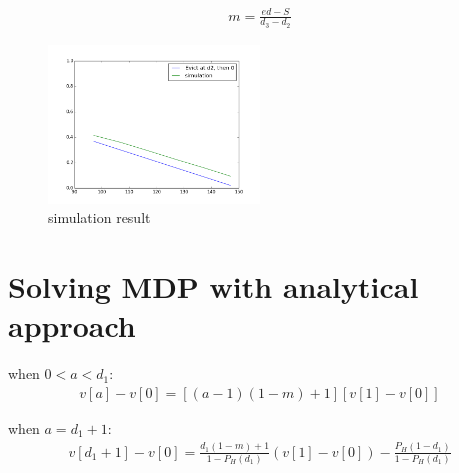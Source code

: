 \documentclass[12pt, letterpaper]{article}
\begin{document}
\begin{equation}
\begin{aligned}
m  = \frac{ed - S}{d_3 - d_2}
\end{aligned}
\end{equation}

\begin{figure}[H]
\centering
\includegraphics[width=0.5\textwidth]{sim_d2_3.png}
\caption{simulation result}
\end{figure}

\section{Solving MDP with analytical approach}

when $0<a<d_1$:
\begin{equation}
\begin{aligned}
v[a]-v[0] = [(a-1)(1-m)+1][v[1]-v[0]]
\end{aligned}
\end{equation}

when $a=d_1+1$:
\begin{equation}
\begin{aligned}
v[d_1+1]-v[0] = \frac{d_1 (1-m)+1}{1-P_{H}(d_1)}(v[1]-v[0]) - \frac{P_{H}(1-d_1)}{1-P_{H}(d_1)}
\end{aligned}
\end{equation}

% 
\end{document}
